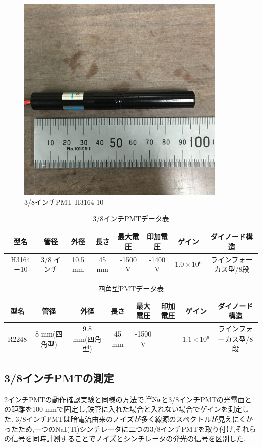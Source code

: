 \begin{figure}[tbp]
	\centering
		\includegraphics[width=10cm]{fig/iguchi/miniPMT.jpg}
	\caption{3/8インチPMT H3164-10}
	\label{3/8inch}
\end{figure}

\begin{table}[tbp]
	\centering
	
	  \begin{tabular}{cccccccc} \hline
		型名& 管径 & 外径 & 長さ & 最大電圧 & 印加電圧 & ゲイン & ダイノード構造 \\ \hline \hline
		H3164－10 & 3/8 インチ & 10.5 mm & 45 mm & -1500 V & -1400 V & $1.0\times10{^{6}}$ &ラインフォーカス型/8段　\\ \hline
	\end{tabular}
	  \caption{3/8インチPMTデータ表}
	  \label{3/8inchPMT}
\end{table}

\begin{table}[tbp]
	\centering
	  \begin{tabular}{cccccccc} \hline
		型名& 管径 & 外径 & 長さ & 最大電圧 & 印加電圧 & ゲイン & ダイノード構造 \\ \hline \hline
		R2248 & 8 mm(四角型) & 9.8 mm(四角型)& 45 mm & -1500 V & - & $1.1\times10{^{6}}$ &ラインフォーカス型/8段 \\ \hline
	\end{tabular}
	  \caption{四角型PMTデータ表}
\end{table}


\subsection{3/8インチPMTの測定}
2インチPMTの動作確認実験と同様の方法で,$\ce{^{22}Na}$と3/8インチPMTの光電面との距離を100 mmで固定し,鉄管に入れた場合と入れない場合でゲインを測定した.
3/8インチPMTは暗電流由来のノイズが多く線源のスペクトルが見えにくかったため,一つのNaI(Tl)シンチレータに二つの3/8インチPMTを取り付け,それらの信号を同時計測することでノイズとシンチレータの発光の信号を区別した.

